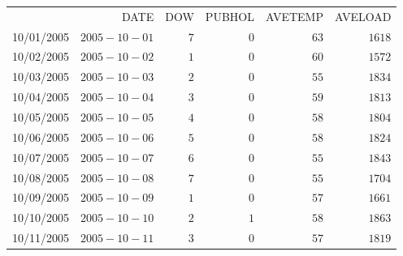 \documentclass[12pt]{report}
\begin{document}
\begin{table}[H]
	\centering
	\begin{tabular}{lrrrrr}
		\multicolumn{1}{c}{}&\multicolumn{1}{r}{DATE}&\multicolumn{1}{r}{DOW}&\multicolumn{1}{r}{PUBHOL}&\multicolumn{1}{r}{AVETEMP}&\multicolumn{1}{r}{AVELOAD}\\
		\multicolumn{1}{c}{10/01/2005}&\multicolumn{1}{r}{$2005-10-01$}&\multicolumn{1}{r}{$7$}&\multicolumn{1}{r}{$0$}&\multicolumn{1}{r}{$63$}&\multicolumn{1}{r}{$1618$}\\
		\multicolumn{1}{c}{10/02/2005}&\multicolumn{1}{r}{$2005-10-02$}&\multicolumn{1}{r}{$1$}&\multicolumn{1}{r}{$0$}&\multicolumn{1}{r}{$60$}&\multicolumn{1}{r}{$1572$}\\
		\multicolumn{1}{c}{10/03/2005}&\multicolumn{1}{r}{$2005-10-03$}&\multicolumn{1}{r}{$2$}&\multicolumn{1}{r}{$0$}&\multicolumn{1}{r}{$55$}&\multicolumn{1}{r}{$1834$}\\
		\multicolumn{1}{c}{10/04/2005}&\multicolumn{1}{r}{$2005-10-04$}&\multicolumn{1}{r}{$3$}&\multicolumn{1}{r}{$0$}&\multicolumn{1}{r}{$59$}&\multicolumn{1}{r}{$1813$}\\
		\multicolumn{1}{c}{10/05/2005}&\multicolumn{1}{r}{$2005-10-05$}&\multicolumn{1}{r}{$4$}&\multicolumn{1}{r}{$0$}&\multicolumn{1}{r}{$58$}&\multicolumn{1}{r}{$1804$}\\
		\multicolumn{1}{c}{10/06/2005}&\multicolumn{1}{r}{$2005-10-06$}&\multicolumn{1}{r}{$5$}&\multicolumn{1}{r}{$0$}&\multicolumn{1}{r}{$58$}&\multicolumn{1}{r}{$1824$}\\
		\multicolumn{1}{c}{10/07/2005}&\multicolumn{1}{r}{$2005-10-07$}&\multicolumn{1}{r}{$6$}&\multicolumn{1}{r}{$0$}&\multicolumn{1}{r}{$55$}&\multicolumn{1}{r}{$1843$}\\
		\multicolumn{1}{c}{10/08/2005}&\multicolumn{1}{r}{$2005-10-08$}&\multicolumn{1}{r}{$7$}&\multicolumn{1}{r}{$0$}&\multicolumn{1}{r}{$55$}&\multicolumn{1}{r}{$1704$}\\
		\multicolumn{1}{c}{10/09/2005}&\multicolumn{1}{r}{$2005-10-09$}&\multicolumn{1}{r}{$1$}&\multicolumn{1}{r}{$0$}&\multicolumn{1}{r}{$57$}&\multicolumn{1}{r}{$1661$}\\
		\multicolumn{1}{c}{10/10/2005}&\multicolumn{1}{r}{$2005-10-10$}&\multicolumn{1}{r}{$2$}&\multicolumn{1}{r}{$1$}&\multicolumn{1}{r}{$58$}&\multicolumn{1}{r}{$1863$}\\
		\multicolumn{1}{c}{10/11/2005}&\multicolumn{1}{r}{$2005-10-11$}&\multicolumn{1}{r}{$3$}&\multicolumn{1}{r}{$0$}&\multicolumn{1}{r}{$57$}&\multicolumn{1}{r}{$1819$}\\

\end{tabular}
\end{table}
\end{document}
